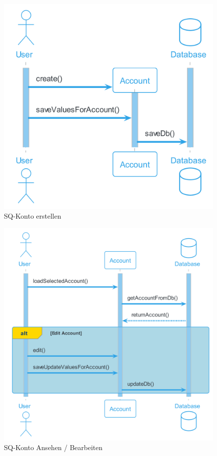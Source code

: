 \begin{figure}[H]
  \begin{center}
    \includegraphics[width=0.5\textheight]{content/diagrams/out/sequenzdiagram/kontoErstellen/KontoErstellen.png}
    \caption{SQ-Konto erstellen}

  \end{center}
\end{figure}

\begin{figure}[H]
  \begin{center}
    \includegraphics[width=0.65\textheight]{content/diagrams/out/sequenzdiagram/kontoAnsehenBearbeiten/KontoAnsehenBearbeiten.png}
    \caption{SQ-Konto Ansehen / Bearbeiten}
  \end{center}
\end{figure}

